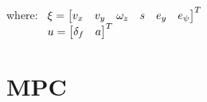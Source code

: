 \documentclass[12pt]{article}
\begin{document}
    where:  $ \begin{array}[t]{l}
                \xi = \begin{bmatrix} v_x & v_y & \omega_z & s & e_y & e_{\psi} \end{bmatrix}^T \\
                u = \begin{bmatrix} \delta_f & a \end{bmatrix}^T \\
            \end{array} $ \\



            \newpage




\section{MPC}
\end{document}
